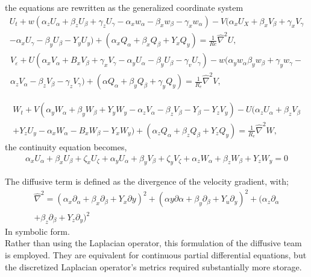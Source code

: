 \documentclass[11pt]{report}
\newcommand{\sps}{\\[0.2cm]}
\newcommand{\NI}{\noindent}
\begin{document}
	the equations are rewritten as the generalized coordinate system
	\begin{gather*}
		U_t + w(\alpha_z U_\alpha +\beta_z U_\beta + \gamma_z U_\gamma - \alpha_x w_\alpha - \beta_x w_\beta - \gamma_x w_\alpha) - V(\alpha_xU_X +  \beta_xV_\beta + \gamma_x V_\gamma \sps
		 - \alpha_x U_\gamma - \beta_y U_\beta - Y_y U_y) + (\alpha_x Q_\alpha + \beta_x Q_\beta + Y_x Q_y) = \frac{1}{Re}\hat{\nabla}^2U,
	\end{gather*}
	\begin{gather*}
		V_\varepsilon + U(\alpha_x V_\alpha + B_xV_\beta + \gamma_x V_\gamma - \alpha_y U_\alpha - \beta_y U_\beta - \gamma_v U_\gamma) - w(\alpha_y w_\alpha \beta_y w_\beta + \gamma_y w_\gamma - \sps
		\alpha_z V_\alpha - \beta_zV_\beta - \gamma_z V_\gamma) + (\alpha Q_\alpha + \beta_y Q_\beta + \gamma_y Q_y) = \frac{1}{R_e} \hat{\nabla}^2 V,
	\end{gather*}
	
	\begin{gather*}
		W_t + V(\alpha_y W_\alpha + \beta_y W_\beta + Y_y W_y - \alpha_z V_\alpha - \beta_z V_\beta - Y_\beta - Y_z V_y) -U(\alpha_z U_\alpha + \beta_z V_\beta \sps
		 + Y_z U_y - \alpha_x W_\alpha - B_x W_\beta - Y_x W_y)+ (\alpha_z Q_\alpha + \beta_z Q_\beta + Y_z Q_y) = \frac{1}{R_e}\hat{\nabla}^2W,
	\end{gather*}
	the continuity equation becomes,
	\begin{gather*}
		\alpha_x U_\alpha + \beta_x U_\beta + \zeta_x U_\zeta + \alpha_y U_\alpha + \beta_y V_\beta + \zeta_y V_\zeta + \alpha_z W_\alpha + \beta_z W_\beta + Y_z W_y = 0
	\end{gather*}
	
	\NI The diffusive term is defined as the divergence of the velocity gradient, with;
	\begin{multline}
		\hat{\nabla}^2 = (\alpha_x\partial_\alpha + \beta_x\partial_\beta + Y_x\partial y)^2 + (\alpha y\partial\alpha + \beta_y \partial_\beta + Y_u\partial_y)^2 + (\alpha_z\partial_\alpha \\+ \beta_z \partial_\beta + Y_z\partial_y)^2
	\end{multline}
	In symbolic form.\\
	
	\NI Rather than using the Laplacian operator, this formulation of the diffusive team is employed. They are equivalent for continuous partial differential equations, but the discretized Laplacian operator's metrics required substantially more storage.
	
\end{document}
